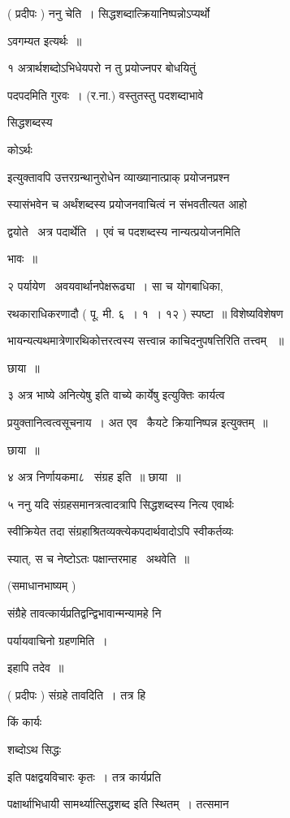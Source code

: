 \documentclass[11pt, openany]{book}
\begin{document}
( प्रदीपः ) ननु चेति~। सिद्धशब्दात्क्रियानिष्पन्नोऽप्यर्थो \textendash\ 

ऽवगम्यत इत्यर्थः~॥ 



१ अत्रार्थशब्दोऽभिधेयपरो न तु प्रयोज्नपर बोधयितुं 

पदपदमिति गुरवः~। (र.ना.) वस्तुतस्तु पदशब्दाभावे {\qt सिद्धशब्दस्य 

कोऽर्थः} इत्युक्तावपि उत्तरग्रन्थानुरोधेन व्याख्यानात्प्राक्
प्रयोजनप्रश्न \textendash\ 

स्यासंभवेन च {\qt अर्थंशब्दस्य प्रयोजनवाचित्वं} न संभवतीत्यत आहो \textendash\ 

द्वयोते \textendash\ अत्र पदार्थेति~। एवं च पदशब्दस्य नान्यत्प्रयोजनमिति 

भावः~॥ 

२ पर्यायेण \textendash\ अवयवार्थानपेक्षरूढ्या~। सा च योगबाधिका, 

रथकाराधिकरणादौ ( पू. मी. ६~। १~। १२ ) स्पष्टा~॥ विशेष्यविशेषण \textendash\ 

भायन्यत्यथमात्रेणारथिकोत्तरत्वस्य सत्त्वान्न काचिदनुपषत्तिरिति तत्त्वम्
~॥ 

छाया~॥ 

३ अत्र भाष्ये {\qt अनित्येषु} इति वाच्ये {\qt कार्येषु} इत्युक्तिः कार्यत्व \textendash\ 

प्रयुक्तानित्वत्वसूचनाय~। अत एव \textendash\ कैयटे क्रियानिष्पन्न इत्युक्तम्~॥ 

छाया~॥ 

४ अत्र निर्णायकमा८ \textendash\ संग्रह इति~॥ छाया~॥ 

५ ननु यदि संग्रहसमानत्रत्वादत्रापि सिद्धशब्दस्य नित्य एवार्थः 

स्वीक्रियेत तदा संग्रहाश्रितव्यक्त्येकपदार्थवादोऽपि स्वीकर्तव्यः 

स्यात्, स च नेष्टोऽतः पक्षान्तरमाह \textendash\ अथवेति~॥ 





(समाधानभाष्यम् ) 

संग्रैहे तावत्कार्यप्रतिद्वन्द्विभावान्मन्यामहे नि \textendash\ 

पर्यायवाचिनो ग्रहणमिति~। 

इहापि तदेव~॥

( प्रदीपः ) संग्रहे तावदिति~। तत्र हि {\qt किं कार्यः 

शब्दोऽथ सिद्धः} इति पक्षद्वयविचारः कृतः~। तत्र कार्यप्रति \textendash\ 

पक्षार्थाभिधायी सामर्थ्यात्सिद्धशब्द इति स्थितम्~। तत्समान \textendash\ 
\end{document}
